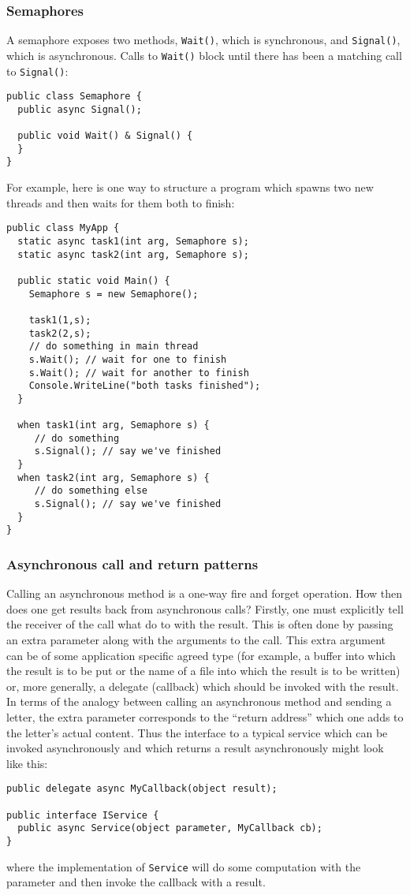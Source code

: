 \documentclass{article}
\begin{document}
\subsubsection{Semaphores}
A semaphore exposes two methods, \verb|Wait()|, which is synchronous, and \verb|Signal()|, which is asynchronous. Calls to \verb|Wait()| block until there has been a matching call to \verb|Signal()|:
\begin{verbatim}
public class Semaphore {
  public async Signal();

  public void Wait() & Signal() {
  }
}
\end{verbatim}
For example, here is one way to structure a program which spawns two
new threads and then waits for them both to finish:
\begin{verbatim}
public class MyApp {
  static async task1(int arg, Semaphore s);
  static async task2(int arg, Semaphore s);

  public static void Main() {
    Semaphore s = new Semaphore();

    task1(1,s);
    task2(2,s);
    // do something in main thread
    s.Wait(); // wait for one to finish
    s.Wait(); // wait for another to finish
    Console.WriteLine("both tasks finished");
  }

  when task1(int arg, Semaphore s) {
     // do something 
     s.Signal(); // say we've finished
  }
  when task2(int arg, Semaphore s) {
     // do something else
     s.Signal(); // say we've finished
  }
}
\end{verbatim}

\subsubsection{Asynchronous call and return patterns}
Calling an asynchronous method is a one-way fire and forget
operation. How then does one get results back from asynchronous calls?
Firstly, one must explicitly tell the receiver of the call what do to
with the result. This is often done by passing an extra parameter
along with the arguments to the call. This extra argument can be of
some application specific agreed type (for example, a buffer into
which the result is to be put or the name of a file into which the result is
to be written) or, more generally, a delegate (callback) which should
be invoked with the result. In terms of the analogy between calling an
asynchronous method and sending a letter, the extra parameter
corresponds to the ``return address'' which one adds to the letter's
actual content. Thus the interface to a typical service which can be
invoked asynchronously and which returns a result asynchronously might
look like this:
\begin{verbatim}
public delegate async MyCallback(object result);

public interface IService {
  public async Service(object parameter, MyCallback cb);
}
\end{verbatim}
where the implementation of \texttt{Service} will do some computation
with the parameter and then invoke the callback with a result.
\end{document}
